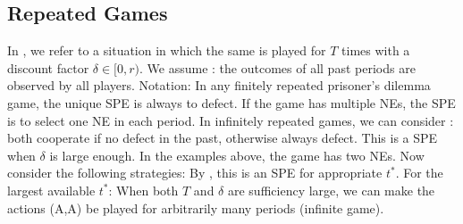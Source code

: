 \documentclass[10pt]{report}
\begin{document}
\subsection{Repeated Games}

In , we refer to a situation in which the same  is played for $T$ times with a discount factor $\delta\in[0,r)$. 
We assume : the outcomes of all past periods are observed by all players. Notation:
In any finitely repeated prisoner's dilemma game, the unique SPE is always to defect. If the game has multiple NEs, the SPE is to select one NE in each period. 
In infinitely repeated games, we can consider : both cooperate if no defect in the past, otherwise always defect. This is a SPE when $\delta$ is large enough. 
In the examples above, the game has two NEs. Now consider the following strategies:
By , this is an SPE for appropriate $t^*$. For the largest available $t^*$:
When both $T$ and $\delta$ are sufficiency large, we can make the actions (A,A) be played for arbitrarily many periods (infinite game). 
\end{document}
